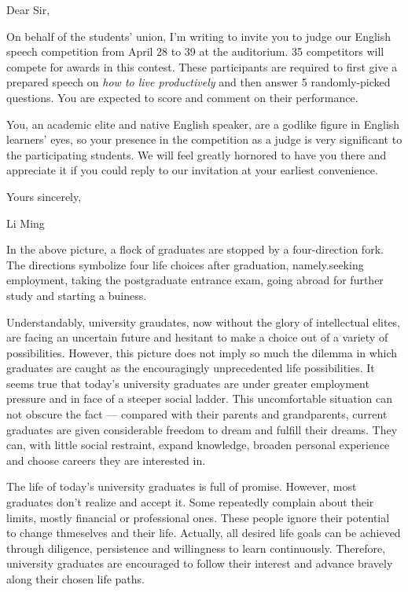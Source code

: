 Dear Sir,

On behalf of the students' union, I'm writing to invite you to judge our English speech competition from April 28 to 39 at the auditorium. 35 competitors will compete for awards in this contest. These participants are required to first give a prepared speech on \emph{how to live productively} and then answer 5 randomly-picked questions. You are expected to score and comment on their performance.

You, an academic elite and native English speaker, are a godlike figure in English learners' eyes, so your presence in the competition as a judge is very significant to the participating students. We will feel greatly hornored to have you there and appreciate it if you could reply to our invitation at your earliest convenience.

\begin{flushright}Yours sincerely,

Li Ming\end{flushright}

In the above picture, a flock of graduates are stopped by a four-direction fork. The directions symbolize four life choices after graduation, namely.seeking employment, taking the postgraduate entrance exam, going abroad for further study and starting a buiness.

Understandably, university graudates, now without the glory of intellectual elites, are facing an uncertain future and hesitant to make a choice out of a variety of possibilities. However, this picture does not imply so much the dilemma in which graduates are caught as the encouragingly unprecedented life possibilities. It seems true that today's university graduates are under greater employment pressure and in face of a steeper social ladder. This uncomfortable situation can not obscure the fact --- compared with their parents and grandparents, current graduates are given considerable freedom to dream and fulfill their dreams. They can, with little social restraint, expand knowledge, broaden personal experience and choose careers they are interested in.

The life of today's university graduates is full of promise. However, most graduates don't realize and accept it. Some repeatedly complain about their limits, mostly financial or professional ones. These people ignore their potential to change thmeselves and their life. Actually, all desired life goals can be achieved through diligence, persistence and willingness to learn continuously. Therefore, university graduates are encouraged to follow their interest and advance bravely along their chosen life paths.